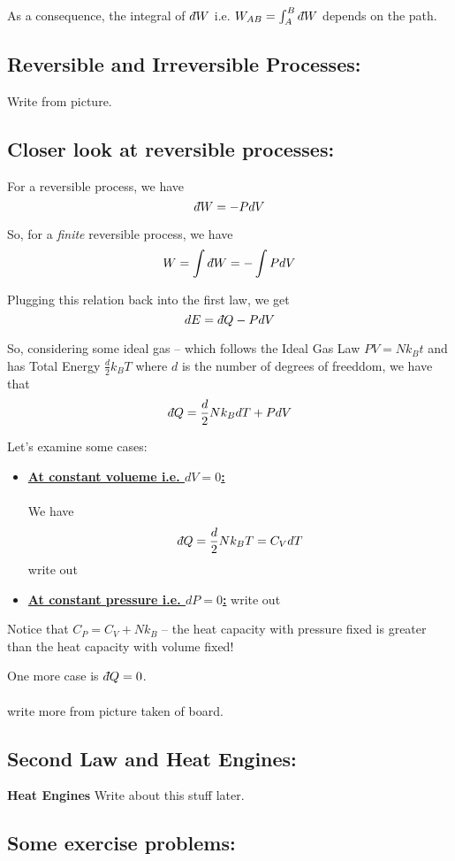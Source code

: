 \documentclass[twoside]{article}
\newcommand{\dbar}{{\mkern3mu\mathchar'26\mkern-12mu d}}
\begin{document}
As a consequence, the integral of $\dbar W$ i.e. $W_{AB} = \int_{A}^{B}  \dbar W $ depends on the path.

\subsection*{Reversible and Irreversible Processes:}
Write from picture.

\subsection*{Closer look at reversible processes:}
For a reversible process, we have 
\[ \dbar W = -P dV \]

So, for a \emph{finite} reversible process, we have 
\[ W = \int \dbar W = -\int PdV\]

Plugging this relation back into the first law, we get 
\[ dE = \dbar Q - PdV \]

So, considering some ideal gas -- which follows the Ideal Gas Law $PV = N k_B t$ and has Total Energy $\frac{d}{2} k_B T$ where $d$ is the number of degrees of freeddom, we have that 
\[ \dbar Q = \frac{d}{2} Nk_B dT + PdV \]

Let's examine some cases:
\begin{itemize}
	\item \underline{\textbf{At constant volueme i.e. $dV = 0$:}}
	\\
	\\
	We have 
	\[ \dbar Q = \frac{d}{2}Nk_B T = C_V dT\]
	write out

	\item \underline{\textbf{At constant pressure i.e. $dP = 0$:}}
	write out
\end{itemize}
Notice that $C_P = C_V + Nk_B$ -- the heat capacity with pressure fixed is greater than the heat capacity with volume fixed!

One more case is $\dbar Q = 0$.
\\
\\
write more from picture taken of board.

\subsection*{Second Law and Heat Engines:}

\textbf{Heat Engines}
Write about this stuff later.

\subsection*{Some exercise problems:}
\end{document}

